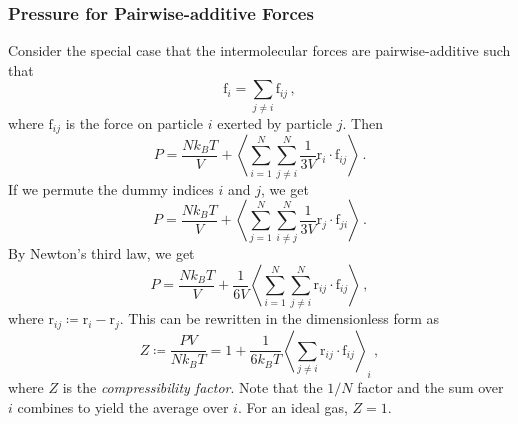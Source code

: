 \documentclass{article}
\theoremstyle{plain}\theoremheaderfont{\normalfont\bfseries}\theorembodyfont{\rmfamily}\theoremseparator{.}\newtheorem*{thm}{Theorem}\newtheorem*{law}{Law}\newtheorem*{pos}{Postulate}
\numberwithin{equation}{section}
\newcommand{\eval}[1]{\left\langle #1 \right\rangle}
\newcommand{\vb}[1]{\bm{\mathrm{#1}}}
\newcommand{\vdot}{\,\bm{\mathrm{\cdot}}\,}
\begin{document}
    \subsubsection{Pressure for Pairwise-additive Forces}
    Consider the special case that the intermolecular forces are pairwise-additive such that
    \begin{equation}
        \vb{f}_i=\sum_{j\ne i}\vb{f}_{ij}\,,
    \end{equation}
    where \(\vb{f}_{ij}\) is the force on particle \(i\) exerted by particle \(j\). Then
    \begin{equation}
        P=\frac{Nk_BT}{V}+\eval{\sum_{i=1}^{N}\sum_{j\ne i}^{N}\frac{1}{3V}\vb{r}_i\vdot\vb{f}_{ij}}\,.
    \end{equation}
    If we permute the dummy indices \(i\) and \(j\), we get
    \begin{equation}
        P=\frac{Nk_BT}{V}+\eval{\sum_{j=1}^{N}\sum_{i\ne j}^{N}\frac{1}{3V}\vb{r}_j\vdot\vb{f}_{ji}}\,.
    \end{equation}
    By Newton's third law, we get
    \begin{equation}
        P=\frac{Nk_BT}{V}+\frac{1}{6V}\eval{\sum_{i=1}^{N}\sum_{j\ne i}^{N}\vb{r}_{ij}\vdot\vb{f}_{ij}}\,,
    \end{equation}
    where \(\vb{r}_{ij}\coloneqq\vb{r}_i-\vb{r}_j\). This can be rewritten in the dimensionless form as
    \begin{equation}
        Z\coloneqq\frac{PV}{Nk_BT}=1+\frac{1}{6k_BT}\eval{\sum_{j\ne i}\vb{r}_{ij}\vdot\vb{f}_{ij}}_i\,,
    \end{equation}
    where \(Z\) is the \textit{compressibility factor}. Note that the \(1/N\) factor and the sum over \(i\) combines to yield the average over \(i\). For an ideal gas, \(Z=1\).
\end{document}
